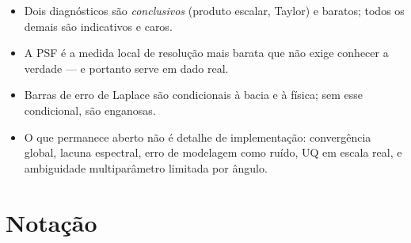 \documentclass[11pt,a4paper,oneside]{report}
\begin{document}
\begin{resumo}
\begin{itemize}[leftmargin=*, itemsep=1pt]
\item Dois diagn\'osticos s\~ao \emph{conclusivos} (produto escalar, Taylor) e
baratos; todos os demais s\~ao indicativos e caros.
\item A PSF \'e a medida local de resolu\c{c}\~ao mais barata que n\~ao exige
conhecer a verdade --- e portanto serve em dado real.
\item Barras de erro de Laplace s\~ao condicionais \`a bacia e \`a f\'isica;
sem esse condicional, s\~ao enganosas.
\item O que permanece aberto n\~ao \'e detalhe de implementa\c{c}\~ao:
converg\^encia global, lacuna espectral, erro de modelagem como ru\'ido, UQ em
escala real, e ambiguidade multipar\^ametro limitada por \^angulo.
\end{itemize}
\end{resumo}

\appendix

\chapter{Nota\c{c}\~ao}
\end{document}
